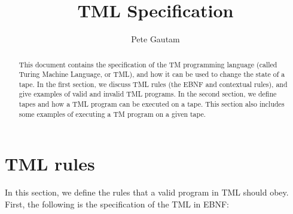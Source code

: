 \documentclass{amsart}
\title{TML Specification}
\author{Pete Gautam}
\theoremstyle{definition}
\begin{document}
    \begin{abstract}
        This document contains the specification of the TM programming language (called Turing Machine Language, or TML), and how it can be used to change the state of a tape. In the first section, we discuss TML rules (the EBNF and contextual rules), and give examples of valid and invalid TML programs. In the second section, we define tapes and how a TML program can be executed on a tape. This section also includes some examples of executing a TM program on a given tape.
    \end{abstract}

    \maketitle
    
    \section{TML rules}
    In this section, we define the rules that a valid program in TML should obey. First, the following is the specification of the TML in EBNF:
\end{document}
